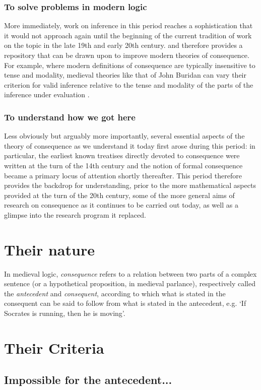 \documentclass[]{article}
\begin{document}
\subsubsection{To solve problems in modern logic}
More immediately, work on inference in this period reaches a sophistication that it would not approach again until the beginning of the current tradition of work on the topic in the late 19th and early 20th century. and therefore provides a repository that can be drawn upon to improve modern theories of consequence. For example, where modern definitions of consequence are typically insensitive to tense and modality, medieval theories like that of John Buridan can vary their criterion for valid inference relative to the tense and modality of the parts of the inference under evaluation \cite{Read2015}.


\subsubsection{To understand how we got here}
Less obviously but arguably more importantly, several essential aspects of the theory of consequence as we understand it today first arose during this period: in particular, the earliest known treatises directly devoted to consequence were written at the turn of the 14th century and the notion of formal consequence became a primary locus of attention shortly thereafter. This period therefore provides the backdrop for understanding, prior to the more mathematical aspects provided at the turn of the 20th century, some of the more general aims of research on consequence as it continues to be carried out today, as well as a glimpse into the research program it replaced. 
\section{Their nature}
In medieval logic, \emph{consequence} refers to a relation between two parts of a complex sentence (or a hypothetical proposition, in medieval parlance), respectively called the \emph{antecedent} and \emph{consequent}, according to which what is stated in the consequent can be said to follow from what is stated in the antecedent, e.g. `If Socrates is running, then he is moving'. 
\section{Their Criteria}
\subsection{Impossible for the antecedent...}
\end{document}
